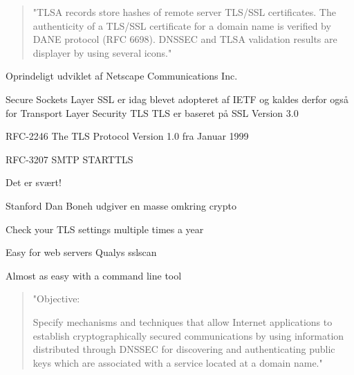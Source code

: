 \documentclass[Screen16to9,17pt]{foils}
\begin{document}


\begin{quote}
"TLSA records store hashes of remote server TLS/SSL certificates. The authenticity of a TLS/SSL certificate for a domain name is verified by DANE protocol (RFC 6698). DNSSEC and TLSA validation results are displayer by using several icons."
\end{quote}





\begin{list1}
\item Oprindeligt udviklet af Netscape Communications Inc.
\item Secure Sockets Layer SSL er idag blevet adopteret af IETF og kaldes
derfor også for Transport Layer Security TLS
TLS er baseret på SSL Version 3.0
\item RFC-2246 The TLS Protocol Version 1.0 fra Januar 1999
\item RFC-3207 SMTP STARTTLS
\item Det er svært!
\item Stanford Dan Boneh udgiver en masse omkring crypto\\ 
\end{list1}







\begin{list2}
\item Check your TLS settings multiple times a year
\item Easy for web servers Qualys sslscan
\item Almost as easy with a command line tool
\end{list2}



\begin{quote}
"Objective:

Specify mechanisms and techniques that allow Internet applications to
establish cryptographically secured communications by using information
distributed through DNSSEC for discovering and authenticating public
keys which are associated with a service located at a domain name."
\end{quote}
\end{document}
